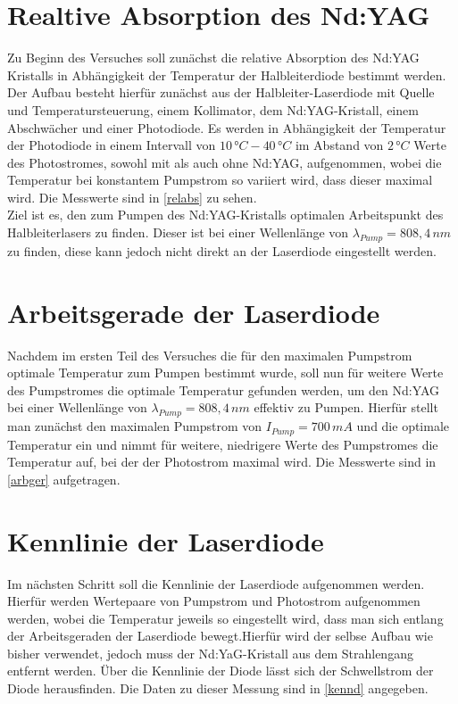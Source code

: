\documentclass[twoside,colorback,accentcolor=tud4c,11pt]{tudreport}
\begin{document}
\section{Realtive Absorption des Nd:YAG}\label{v1}
Zu Beginn des Versuches soll zunächst die relative Absorption des Nd:YAG Kristalls in Abhängigkeit der Temperatur der Halbleiterdiode bestimmt werden. Der Aufbau besteht hierfür zunächst aus der Halbleiter-Laserdiode mit Quelle und Temperatursteuerung, einem Kollimator, dem Nd:YAG-Kristall, einem Abschwächer und einer Photodiode. Es werden in Abhängigkeit der Temperatur der Photodiode in einem Intervall von $10\,\si{°C}-40\,\si{°C}$ im Abstand von $2\,\si{°C}$ Werte des Photostromes, sowohl mit als auch ohne Nd:YAG, aufgenommen, wobei die Temperatur bei konstantem Pumpstrom so variiert wird, dass dieser maximal wird. Die Messwerte sind in \ref{relabs} zu sehen.\\
Ziel ist es, den zum Pumpen des Nd:YAG-Kristalls optimalen Arbeitspunkt des Halbleiterlasers zu finden. Dieser ist bei einer Wellenlänge von $\lambda_{Pump}=808,4\,\si{nm}$ zu finden, diese kann jedoch nicht direkt an der Laserdiode eingestellt werden.
\section{Arbeitsgerade der Laserdiode}\label{v2}
Nachdem im ersten Teil des Versuches die für den maximalen Pumpstrom optimale Temperatur zum Pumpen bestimmt wurde, soll nun für weitere Werte des Pumpstromes die optimale Temperatur gefunden werden, um den Nd:YAG bei einer Wellenlänge von $\lambda_{Pump}=808,4\,\si{nm}$ effektiv zu Pumpen. Hierfür stellt man zunächst den maximalen Pumpstrom von $I_{Pump}=700\,\si{mA}$ und die optimale Temperatur ein und nimmt für weitere, niedrigere Werte des Pumpstromes die Temperatur auf, bei der der Photostrom maximal wird. Die Messwerte sind in \ref{arbger} aufgetragen.
\section{Kennlinie der Laserdiode}\label{v3}
Im nächsten Schritt soll die Kennlinie der Laserdiode aufgenommen werden. Hierfür werden Wertepaare von Pumpstrom und Photostrom aufgenommen werden, wobei die Temperatur jeweils so eingestellt wird, dass man sich entlang der Arbeitsgeraden der Laserdiode bewegt.Hierfür wird der selbse Aufbau wie bisher verwendet, jedoch muss der Nd:YaG-Kristall aus dem Strahlengang entfernt werden. Über die Kennlinie der Diode lässt sich der Schwellstrom der Diode herausfinden. Die Daten zu dieser Messung sind in \ref{kennd} angegeben.
\end{document}
